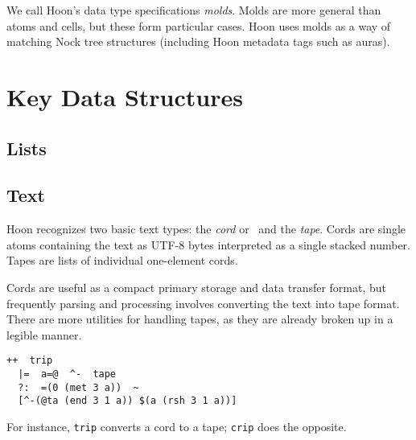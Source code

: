 We call Hoon's data type specifications \emph{molds}.  Molds are more general than atoms and cells, but these form particular cases.  Hoon uses molds as a way of matching Nock tree structures (including Hoon metadata tags such as auras).




\section{Key Data Structures}

\subsection{Lists}

\subsection{Text}


Hoon recognizes two basic text types:  the \emph{cord} or \patt~and the \emph{tape}.  Cords are single atoms containing the text as UTF-8 bytes interpreted as a single stacked number.  Tapes are lists of individual one-element cords.


Cords are useful as a compact primary storage and data transfer format, but frequently parsing and processing involves converting the text into tape format.  There are more utilities for handling tapes, as they are already broken up in a legible manner.

\begin{lstlisting}
++  trip
  |=  a=@  ^-  tape
  ?:  =(0 (met 3 a))  ~
  [^-(@ta (end 3 1 a)) $(a (rsh 3 1 a))]
\end{lstlisting}


For instance, \texttt{trip} converts a cord to a tape; \texttt{crip} does the opposite.


